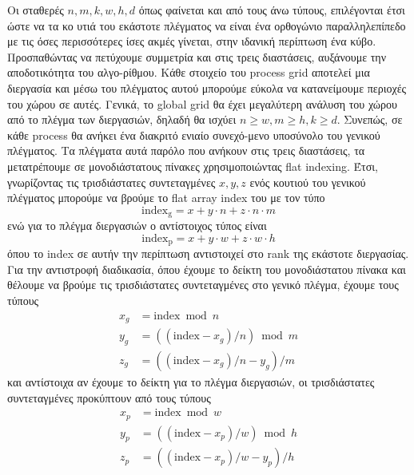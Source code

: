 \documentclass[11pt,a4paper,titlepage]{article}
\begin{document}
	Οι σταθερές $n, m, k, w, h, d$ όπως φαίνεται και από τους άνω τύπους, επιλέγονται έτσι ώστε να τα κο		 		υτιά του εκάστοτε πλέγματος να είναι ένα ορθογώνιο παραλληλεπίπεδο με τις όσες περισσότερες ίσες ακμές γίνεται, στην ιδανική περίπτωση ένα κύβο. Προσπαθώντας να πετύχουμε συμμετρία και στις τρεις διαστάσεις, αυξάνουμε την αποδοτικότητα του αλγο-ρίθμου. Κάθε στοιχείο του process grid αποτελεί μια διεργασία και μέσω του πλέγματος αυτού μπορούμε εύκολα να κατανείμουμε περιοχές του χώρου σε αυτές. Γενικά, το global grid θα έχει μεγαλύτερη ανάλυση του χώρου από το πλέγμα των διεργασιών, δηλαδή θα ισχύει $n \geq w, m \geq h, k \geq d$. Συνεπώς, σε κάθε process θα ανήκει ένα διακριτό ενιαίο συνεχό-μενο υποσύνολο  του γενικού πλέγματος. Τα πλέγματα αυτά παρόλο που ανήκουν στις τρεις διαστάσεις, τα μετατρέπουμε σε μονοδιάστατους πίνακες χρησιμοποιώντας flat indexing. Έτσι, γνωρίζοντας τις τρισδιάστατες συντεταγμένες $x,y,z$ ενός κουτιού του γενικού πλέγματος μπορούμε να βρούμε το flat array index του με τον τύπο
	\begin{equation}
		\mathrm{index_g} = x + y\cdot n + z \cdot n\cdot m
	\end{equation}
	ενώ για το πλέγμα διεργασιών ο αντίστοιχος τύπος είναι
	\begin{equation} \label{eq:2}
		\mathrm{index_p} = x + y\cdot w + z \cdot w\cdot h
	\end{equation}
	όπου το index σε αυτήν την περίπτωση αντιστοιχεί στο rank της εκάστοτε διεργασίας. Για την αντιστροφή διαδικασία, όπου έχουμε το δείκτη του μονοδιάστατου πίνακα και θέλουμε να βρούμε τις τρισδιάστατες συντεταγμένες στο γενικό πλέγμα, έχουμε τους τύπους
	\begin{align}
		x_g &= \mathrm{index} \bmod n\\
		y_g &= \left(\left(\mathrm{index} - x_g\right)/n\right) \bmod m\\
 		z_g &= \left(\left(\mathrm{index} - x_g\right)/n - y_g\right) / m
	\end{align}
	και αντίστοιχα αν έχουμε το δείκτη για το πλέγμα διεργασιών, οι τρισδιάστατες συντεταγμένες προκύπτουν από τους τύπους
 	\begin{align}
	 	x_p &= \mathrm{index} \bmod w\\
	 	y_p &= \left(\left(\mathrm{index} - x_p\right)/w\right) \bmod h\\
	 	z_p &= \left(\left(\mathrm{index} - x_p\right)/w - y_p\right) / h
 	\end{align}\\[-2em]
 	
\end{document}
